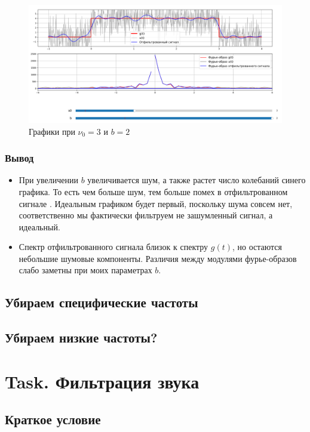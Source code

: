 \documentclass[a4paper,12pt]{article}
\begin{document}
\begin{figure}[H]  
    \centering
    \includegraphics[width=1\textwidth]{../images/1.1_2_3.png}
    \caption{Графики при \(\nu_0 = 3\) и \(b = 2\)}  
    \label{fig:my_image}  
\end{figure}

\subsubsection{Вывод}

\begin{itemize}
    \item При увеличении \(b\) увеличивается шум, а также растет число колебаний
    синего графика. То есть чем больше шум, тем больше помех в отфильтрованном сигнале
    . Идеальным графиком будет первый, поскольку шума совсем нет, 
    соответственно мы фактически фильтруем не зашумленный сигнал, а идеальный.

    \item Спектр отфильтрованного сигнала близок к спектру \(g(t)\), но остаются небольшие шумовые компоненты.
    Различия между модулями фурье-образов слабо заметны при моих параметрах \(b\).

\end{itemize}





\subsection{Убираем специфические частоты}
\subsection{Убираем низкие частоты?}




\section{Task. Фильтрация звука}
\subsection{Краткое условие}
\end{document}
